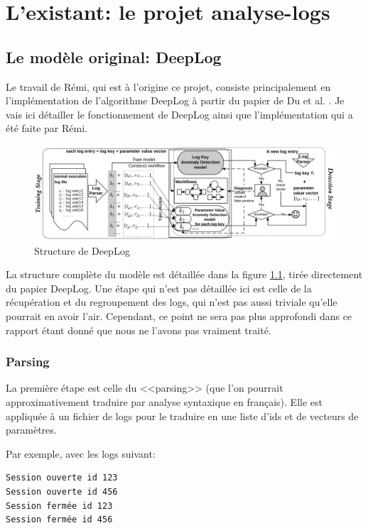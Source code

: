 \documentclass[openany, 11pt]{memoir}
\begin{document}
\newpage
\chapter{L'existant: le projet analyse-logs}

\section{Le modèle original: DeepLog}
\label{sectiondeeplog}

Le travail de Rémi, qui est à l'origine ce projet, consiste principalement en l'implémentation de l'algorithme DeepLog à partir du papier de Du et al. \cite{deeplog}. Je vais ici détailler le fonctionnement de DeepLog ainsi que l'implémentation qui a été faite par Rémi.

\begin{figure}[ht]
	\centering
	\includegraphics[width=\textwidth]{images/deeplog.png}
	\caption{Structure de DeepLog}
	\label{deeplog}
\end{figure}

La structure complète du modèle est détaillée dans la figure \ref{deeplog}, tirée directement du papier DeepLog. Une étape qui n'est pas détaillée ici est celle de la récupération et du regroupement des \glspl{log}, qui n'est pas aussi triviale qu'elle pourrait en avoir l'air. Cependant, ce point ne sera pas plus approfondi dans ce rapport étant donné que nous ne l'avons pas vraiment traité.

\subsection{Parsing}

La première étape est celle du <<parsing>> (que l'on pourrait approximativement traduire par analyse syntaxique en français). Elle est appliquée à un fichier de \glspl{log} pour le traduire en une liste d'ids et de vecteurs de paramètres.

Par exemple, avec les logs suivant:

\begin{lstlisting}
Session ouverte id 123
Session ouverte id 456
Session fermée id 123
Session fermée id 456
\end{lstlisting}
\end{document}
